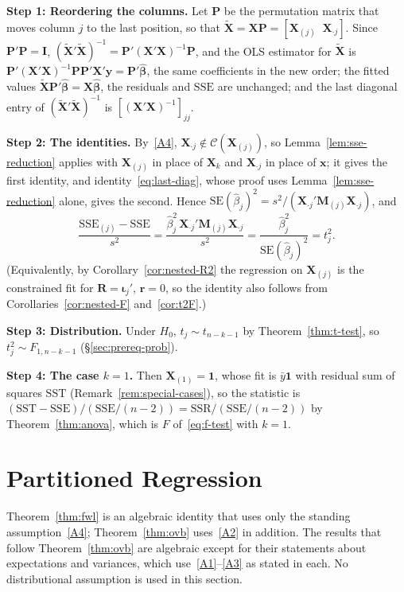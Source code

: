 \documentclass[12pt,a4paper]{article}
\makeatletter
\theoremstyle{definition}
\renewenvironment{proof}[1][\proofname]{\par
  \pushQED{\qed}%
  \normalfont \topsep6\p@\@plus6\p@\relax
  \trivlist
  \item[\hskip\labelsep\bfseries #1\@addpunct{.}]\ignorespaces
}{%
  \popQED\endtrivlist\@endpefalse
}
\newcommand{\SST}{\mathrm{SST}}
\newcommand{\SSR}{\mathrm{SSR}}
\newcommand{\SSE}{\mathrm{SSE}}
\newcommand{\SE}{\mathrm{SE}}
\newcommand{\bX}{\mathbf{X}}
\newcommand{\by}{\mathbf{y}}
\newcommand{\bx}{\mathbf{x}}
\def\bb{\boldsymbol{\beta}}
\newcommand{\bI}{\mathbf{I}}
\newcommand{\bM}{\mathbf{M}}
\newcommand{\bR}{\mathbf{R}}
\newcommand{\br}{\mathbf{r}}
\newcommand{\bone}{\mathbf{1}}
\newcommand{\bP}{\mathbf{P}}
\newcommand{\calC}{\mathcal{C}}
\makeatother
\begin{document}
\begin{proof}
\textbf{Step 1: Reordering the columns.} Let $\bP$ be the permutation matrix that moves column $j$ to the last position, so that $\tilde{\bX} = \bX\bP = [\bX_{(j)} \;\; \bX_{\cdot j}]$. Since $\bP'\bP = \bI$, $(\tilde{\bX}'\tilde{\bX})^{-1} = \bP'(\bX'\bX)^{-1}\bP$, and the OLS estimator for $\tilde{\bX}$ is $\bP'(\bX'\bX)^{-1}\bP\bP'\bX'\by = \bP'\hat{\bb}$, the same coefficients in the new order; the fitted values $\tilde{\bX}\bP'\hat{\bb} = \bX\hat{\bb}$, the residuals and $\SSE$ are unchanged; and the last diagonal entry of $(\tilde{\bX}'\tilde{\bX})^{-1}$ is $[(\bX'\bX)^{-1}]_{jj}$.

\textbf{Step 2: The identities.} By~\ref{A4}, $\bX_{\cdot j} \notin \calC(\bX_{(j)})$, so Lemma~\ref{lem:sse-reduction} applies with $\bX_{(j)}$ in place of $\bX_k$ and $\bX_{\cdot j}$ in place of $\bx$; it gives the first identity, and identity~\eqref{eq:last-diag}, whose proof uses Lemma~\ref{lem:sse-reduction} alone, gives the second. Hence $\SE(\hat\beta_j)^2 = s^2/(\bX_{\cdot j}'\bM_{(j)}\bX_{\cdot j})$, and
\[
\frac{\SSE_{(j)} - \SSE}{s^2} = \frac{\hat\beta_j^2\,\bX_{\cdot j}'\bM_{(j)}\bX_{\cdot j}}{s^2} = \frac{\hat\beta_j^2}{\SE(\hat\beta_j)^2} = t_j^2.
\]
(Equivalently, by Corollary~\ref{cor:nested-R2} the regression on $\bX_{(j)}$ is the constrained fit for $\bR = \boldsymbol\iota_j'$, $\br = 0$, so the identity also follows from Corollaries~\ref{cor:nested-F} and~\ref{cor:t2F}.)

\textbf{Step 3: Distribution.} Under $H_0$, $t_j \sim t_{n-k-1}$ by Theorem~\ref{thm:t-test}, so $t_j^2 \sim F_{1,n-k-1}$ (\S\ref{sec:prereq-prob}).

\textbf{Step 4: The case $k = 1$.} Then $\bX_{(1)} = \bone$, whose fit is $\bar y\bone$ with residual sum of squares $\SST$ (Remark~\ref{rem:special-cases}), so the statistic is $(\SST - \SSE)/(\SSE/(n-2)) = \SSR/(\SSE/(n-2))$ by Theorem~\ref{thm:anova}, which is $F$ of~\eqref{eq:f-test} with $k = 1$.
\end{proof}

\section{Partitioned Regression}\label{sec:fwl}

Theorem~\ref{thm:fwl} is an algebraic identity that uses only the standing assumption~\ref{A4}; Theorem~\ref{thm:ovb} uses~\ref{A2} in addition. The results that follow Theorem~\ref{thm:ovb} are algebraic except for their statements about expectations and variances, which use~\ref{A1}--\ref{A3} as stated in each. No distributional assumption is used in this section.
\end{document}
